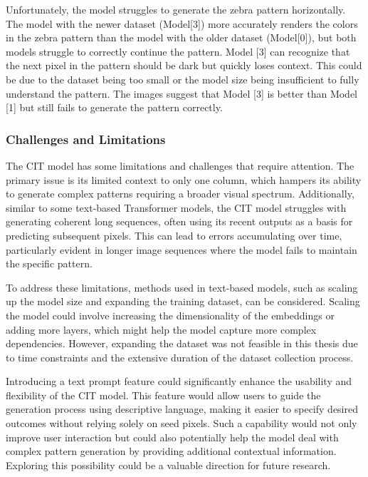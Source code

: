 \begin{itemize}
        Unfortunately, the model struggles to generate the zebra pattern horizontally. The model with the newer dataset (Model[3]) more accurately renders the colors in the zebra pattern than the model with the older dataset (Model[0]), but both models struggle to correctly continue the pattern. Model [3] can recognize that the next pixel in the pattern should be dark but quickly loses context. This could be due to the dataset being too small or the model size being insufficient to fully understand the pattern. The images suggest that Model [3] is better than Model [1] but still fails to generate the pattern correctly.
       
    \end{itemize}

    \subsubsection{Challenges and Limitations}

    The CIT model has some limitations and challenges that require attention. The primary issue is its limited context to only one column, which hampers its ability to generate complex patterns requiring a broader visual spectrum. Additionally, similar to some text-based Transformer models, the CIT model struggles with generating coherent long sequences, often using its recent outputs as a basis for predicting subsequent pixels. This can lead to errors accumulating over time, particularly evident in longer image sequences where the model fails to maintain the specific pattern. 

    To address these limitations, methods used in text-based models, such as scaling up the model size and expanding the training dataset, can be considered. Scaling the model could involve increasing the dimensionality of the embeddings or adding more layers, which might help the model capture more complex dependencies. However, expanding the dataset was not feasible in this thesis due to time constraints and the extensive duration of the dataset collection process.

    Introducing a text prompt feature could significantly enhance the usability and flexibility of the CIT model. This feature would allow users to guide the generation process using descriptive language, making it easier to specify desired outcomes without relying solely on seed pixels. Such a capability would not only improve user interaction but could also potentially help the model deal with complex pattern generation by providing additional contextual information. Exploring this possibility could be a valuable direction for future research.
